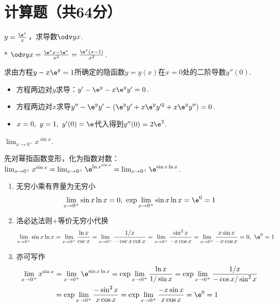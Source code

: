 \newpage
\section{计算题（共64分）}
\begin{problem}[导数商的求导法则]
    $y=\frac{\e^x}{x}$，求导数$\odv yx$.
\end{problem}
\begin{solution}*
    $\odv yx=\frac{\e^xx-\e^x}{x^2}=\frac{\e^x(x-1)}{x^2}$.
\end{solution}

\begin{problem}[隐函数求导]
    求由方程$y-x\e^y=1$所确定的隐函数$y=y(x)$在$x=0$处的二阶导数$y''(0)$.
\end{problem}
\begin{solution}
\begin{itemize}
    \item 方程两边对$y$求导：$y'-\e^y-x\e^yy'=0$.
    \item 方程两边对$x$求导$y''-\e^yy'-(\e^yy'+x\e^yy'^2+x\e^yy'')=0$.
    \item $x=0,\ y=1,\ y'(0)=\e$代入得到$y''(0)=2\e^2$.
\end{itemize}
\end{solution}

\begin{problem}
    $\lim_{x\to 0^+}x^{\sin x}$.
\end{problem}
\begin{solution}
    先对幂指函数变形，化为指数对数：$\lim_{x\to 0^+}x^{\sin x}=\lim_{x\to 0^+}\e^{\ln x^{\sin x}}=\lim_{x\to 0^+}\e^{\sin x\ln x}$.
\begin{enumerate}
    \item 无穷小乘有界量为无穷小
    \[\lim_{x\to 0^+}\sin x\ln x=0,\ \exp\lim_{x\to 0^+}\sin x\ln x=\e^0=1\]
    \item 洛必达法则+等价无穷小代换
    \[\lim_{x\to 0^+}\sin x\ln x=\lim_{x\to 0^+}\frac{\ln x}{\csc x}=\lim_{x\to 0^+}\frac{1/x}{-\csc x\cot x}=\lim_{x\to 0^+}\frac{\sin^2x}{-x\cos x}=\lim_{x\to 0^+}\frac{x\sin x}{-x\cos x}=0,\ \e^0=1\]
    \item 亦可写作
    \[\begin{aligned}
        \lim_{x\to 0^+}x^{\sin x}&=\lim_{x\to 0^+}\e^{\sin x\ln x}=\exp\lim_{x\to 0^+}\frac{\ln x}{1/\sin x}=\exp\lim_{x\to 0^+}\frac{1/x}{-\cos x/\sin^2 x}\\
        &=\exp\lim_{x\to 0^+}\frac{-\sin^2x}{x\cos x}=\exp\lim_{x\to 0^+}\frac{-x\sin x}{x\cos x}=\e^0=1
    \end{aligned}\]
\end{enumerate}
\end{solution}

